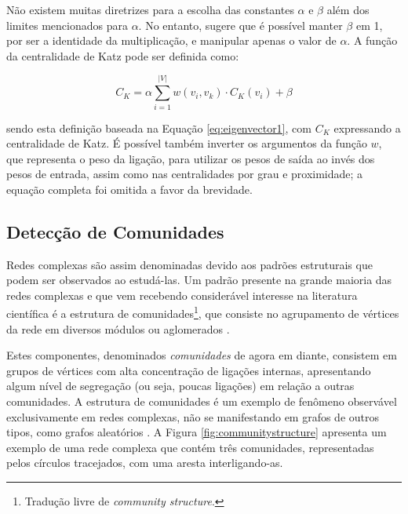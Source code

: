 Não existem muitas diretrizes para a escolha das constantes $\alpha$ e $\beta$ além dos limites mencionados para $\alpha$. No entanto,  sugere que é possível manter $\beta$ em 1, por ser a identidade da multiplicação, e manipular apenas o valor de $\alpha$. A função da centralidade de Katz pode ser definida como:

\begin{equation}
    \label{eq:katz}
    C_K = \alpha \sum_{i=1}^{|V|} w(v_i, v_k) \cdot C_K(v_i) + \beta
\end{equation}

\noindent sendo esta definição baseada na Equação \ref{eq:eigenvector1}, com $C_K$ expressando a centralidade de Katz. É possível também inverter os argumentos da função $w$, que representa o peso da ligação, para utilizar os pesos de saída ao invés dos pesos de entrada, assim como nas centralidades por grau e proximidade; a equação completa foi omitida a favor da brevidade.

\subsection{Detecção de Comunidades} \label{sec:communities}

Redes complexas são assim denominadas devido aos padrões estruturais que podem ser observados ao estudá-las. Um padrão presente na grande maioria das redes complexas e que vem recebendo considerável interesse na literatura científica é a estrutura de comunidades\footnote{Tradução livre de \textit{community structure}.}, que consiste no agrupamento de vértices da rede em diversos módulos ou aglomerados \cite{Fortunato2016}.

Estes componentes, denominados \emph{comunidades} de agora em diante, consistem em grupos de vértices com alta concentração de ligações internas, apresentando algum nível de segregação (ou seja, poucas ligações) em relação a outras comunidades. A estrutura de comunidades é um exemplo de fenômeno observável exclusivamente em redes complexas, não se manifestando em grafos de outros tipos, como grafos aleatórios \cite{Fortunato2007}. A Figura \ref{fig:communitystructure} apresenta um exemplo de uma rede complexa que contém três comunidades, representadas pelos círculos tracejados, com uma aresta interligando-as.

